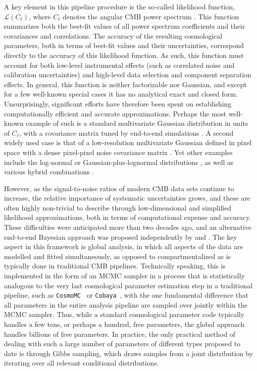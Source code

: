 \documentclass[twocolumn]{../common/aa}
\def\cosmomc{\texttt{CosmoMC}}
\def\cobaya{\texttt{Cobaya}}
\begin{document}
A key element in this pipeline procedure is the so-called likelihood function, $\mathcal{L}(C_{\ell})$, where $C_{\ell}$ denotes the angular CMB power spectrum \citep[e.g.,][]{planck2016-l05}. This function summarizes both the best-fit values of all power spectrum coefficients and their covariances and correlations. The accuracy of the resulting cosmological parameters, both in terms of best-fit values and their uncertainties, correspond directly to the accuracy of this likelihood function. As such, this function must account for both low-level instrumental effects (such as correlated noise and calibration uncertainties) and high-level data selection and component separation effects. In general, this function is neither factorizable nor Gaussian, and except for a few well-known special cases it has no analytical exact and closed form. Unsurprisingly, significant efforts have therefore been spent on establishing computationally efficient and accurate approximations. Perhaps the most well-known example of such is a standard multivariate Gaussian distribution in units of $C_{\ell}$, with a covariance matrix tuned by end-to-end simulations \citep[e.g.,][]{planck2016-l05}. A second widely used case is that of a low-resolution multivariate Gaussian defined in pixel space with a dense pixel-pixel noise covariance matrix \citep{hinshaw2012,planck2016-l05}. Yet other examples include the log-normal or Gaussian-plus-lognormal distributions \citep[e.g.,][]{verde2003}, as well as various hybrid combinations \citep[e.g.,][]{gjerlow2013}. 

However, as the signal-to-noise ratios of modern CMB data sets continue to increase, the relative importance of systematic uncertainties grows, and these are often highly non-trivial to describe through low-dimensional and simplified likelihood approximations, both in terms of computational expense and accuracy. These difficulties were anticipated more than two decades ago, and an alternative end-to-end Bayesian approach was proposed independently by \citet{jewell2004} and \citet{wandelt2004}. The key aspect in this framework is global analysis, in which all aspects of the data are modelled and fitted simultaneously, as opposed to compartmentalized as is typically done in traditional CMB pipelines. Technically speaking, this is implemented in the form of an MCMC sampler in a process that is statistically analogous to the very last cosmological parameter estimation step in a traditional pipeline, such as \cosmomc\ \citep{cosmomc} or \cobaya\ \citep{Torrado:2020dgo}, with the one fundamental difference that all parameters in the entire analysis pipeline are sampled over jointly within the MCMC sampler. Thus, while a standard cosmological parameter code typically handles a few tens, or perhaps a hundred, free parameters, the global approach handles billions of free parameters. In practice, the only practical method of dealing with such a large number of parameters of different types proposed to date is through Gibbs sampling, which draws samples from a joint distribution by iterating over all relevant conditional distributions.
\end{document}
